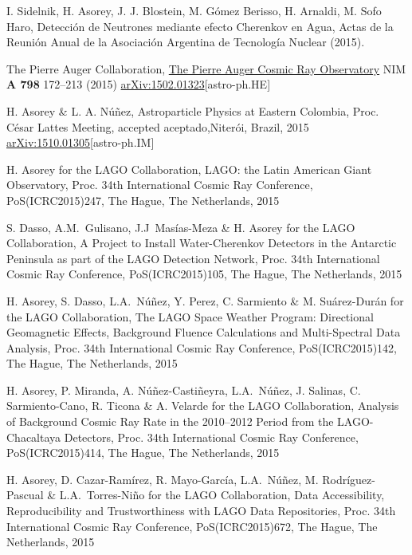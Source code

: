 \begin{etaremune}
\item {} I. Sidelnik, H. Asorey, J. J. Blostein, M. Gómez Berisso, H. Arnaldi, M. Sofo Haro, {{Detección de Neutrones mediante efecto Cherenkov en Agua}}, Actas de la Reunión Anual de la Asociación Argentina de Tecnología Nuclear (2015).

\item {}The Pierre Auger Collaboration, \href{http://dx.doi.org/10.1016/j.nima.2015.06.058}{{The Pierre Auger Cosmic Ray Observatory}} NIM {\textbf{A 798}} 172--213 (2015) \href{http://arxiv.org/abs/1502.01323}{arXiv:1502.01323}[astro-ph.HE]

\item {}H. Asorey \& L. A. Núñez, {{Astroparticle Physics at Eastern Colombia}}, \en Proc.
César Lattes Meeting, \ifeng accepted \else aceptado,\fi Niterói, Brazil, 2015 \href{http://arxiv.org/abs/1510.01305}{arXiv:1510.01305}[astro-ph.IM]

\item {}H. Asorey for the LAGO Collaboration, {{LAGO: the Latin American Giant Observatory}}, \en Proc.
34th International Cosmic Ray Conference, PoS(ICRC2015)247, The Hague, The Netherlands, 2015

\item {}S. Dasso, A.M.\ Gulisano, J.J\  Masías-Meza \& H. Asorey for the LAGO Collaboration, {{A Project to Install Water-Cherenkov Detectors in the Antarctic Peninsula as part of the LAGO Detection Network}}, \en Proc.
34th International Cosmic Ray Conference, PoS(ICRC2015)105, The Hague, The Netherlands, 2015

\item {}H. Asorey, S. Dasso, L.A.\ Núñez, Y. Perez, C. Sarmiento \& M. Suárez-Durán for the LAGO Collaboration, {{The LAGO Space Weather Program: Directional Geomagnetic Effects, Background Fluence Calculations and Multi-Spectral Data Analysis}}, \en Proc.
34th International Cosmic Ray Conference, PoS(ICRC2015)142, The Hague, The Netherlands, 2015

\item {}H. Asorey, P. Miranda, A. Núñez-Castiñeyra, L.A.\ Núñez, J. Salinas, C. Sarmiento-Cano, R. Ticona \& A. Velarde for the LAGO Collaboration, {{Analysis of Background Cosmic Ray Rate in the 2010--2012 Period from the LAGO-Chacaltaya Detectors}}, \en Proc.
34th International Cosmic Ray Conference, PoS(ICRC2015)414, The Hague, The Netherlands, 2015

\item {}H. Asorey, D. Cazar-Ramírez, R. Mayo-García, L.A.\ Núñez, M. Rodríguez-Pascual \& L.A.\ Torres-Niño for the LAGO Collaboration, {{Data Accessibility, Reproducibility and Trustworthiness with LAGO Data Repositories}}, \en Proc.
34th International Cosmic Ray Conference, PoS(ICRC2015)672, The Hague, The Netherlands, 2015



\end{etaremune}
